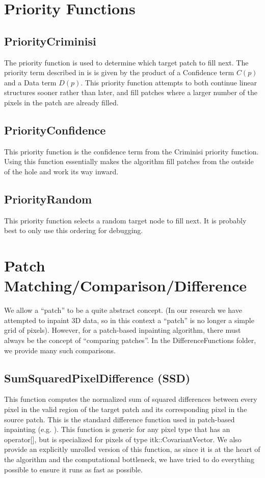 \documentclass{InsightArticle}
\begin{document}
\section{Priority Functions}
\label{sec:PriorityFunctions}
\subsection{PriorityCriminisi}
The priority function is used to determine which target patch to fill next. The priority term described in \cite{criminis} is is given by the product of a Confidence term $C(p)$ and a Data term $D(p)$. This priority function attempts to both continue linear structures sooner rather than later, and fill patches where a larger number of the pixels in the patch are already filled.

\subsection{PriorityConfidence}
This priority function is the confidence term from the Criminisi priority function. Using this function essentially makes the algorithm fill patches from the outside of the hole and work its way inward.

\subsection{PriorityRandom}
This priority function selects a random target node to fill next. It is probably best to only use this ordering for debugging.

\section{Patch Matching/Comparison/Difference}
\label{sec:PatchMatching}
We allow a ``patch'' to be a quite abstract concept. (In our research we have attempted to inpaint 3D data, so in this context a ``patch'' is no longer a simple grid of pixels). However, for a patch-based inpainting algorithm, there must always be the concept of ``comparing patches''. In the DifferenceFunctions folder, we provide many such comparisons.

\subsection{SumSquaredPixelDifference (SSD)}
This function computes the normalized sum of squared differences between every pixel in the valid region of the target patch and its corresponding pixel in the source patch. This is the standard difference function used in patch-based inpainting (e.g. \cite{criminisi}). This function is generic for any pixel type that has an operator[], but is specialized for pixels of type itk::CovariantVector. We also provide an explicitly unrolled version of this function, as since it is at the heart of the algorithm and the computational bottleneck, we have tried to do everything possible to ensure it runs as fast as possible.
\end{document}
